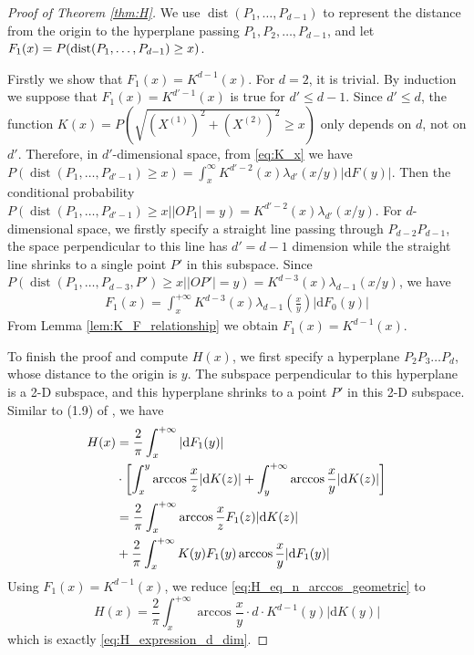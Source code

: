 \documentclass[conference,a4paper]{IEEEtran}
\DeclareMathOperator{\dist}{dist}
\def\d{\mathrm{d}}
\begin{document}
\begin{proof}[Proof of Theorem \ref{thm:H}]
     
We use $\dist(P_1,\dots, P_{d-1})$ to represent
the distance from the origin to the hyperplane passing $P_1,P_2,\dots, P_{d-1}$,
and let $F_1(x)=P(\dist(P_1,\dots, P_{d-1})\linebreak\geq x)$.


Firstly we show that $F_1(x)=K^{d-1}(x)$.
For $d=2$, it is trivial.
By induction we suppose that $F_1(x)=K^{d'-1}(x)$ is true for
$d'\leq d-1$.
Since $d'\leq d$,
the function $K(x)=P(\sqrt{(X^{(1)})^2 + (X^{(2)})^2} \geq x)$
only depends on $d$,
not on $d'$.
Therefore, in $d'$-dimensional space,
from \eqref{eq:K_x} we have $
P(\dist(P_1, \dots, P_{d'-1})\geq x) = \int_{x}^{\infty} K^{d'-2}(x)\lambda_{d'}(x/y)|\d F(y)|
$.
Then the conditional probability $P(\dist(P_1,\dots, P_{d'-1})\geq x \Big\vert |OP_1|=y)
=K^{d'-2}(x)\lambda_{d'}(x/y)$.
For $d$-dimensional space, 
we firstly specify a straight line passing through $P_{d-2}P_{d-1}$,
the space perpendicular 
to this line has $d'=d-1$ dimension while the straight line shrinks to a single point $P'$
in this subspace. Since
$P(\dist(P_1,\dots,P_{d-3},P')\geq x \Big\vert |OP'|=y)=
K^{d-3}(x)\lambda_{d-1}(x/y)$,
we have
\begin{align*}
    F_1(x) = \int_x^{+\infty} K^{d-3}(x) \lambda_{d-1}(\frac{x}{y})|\d F_0(y)|
\end{align*}
From Lemma \ref{lem:K_F_relationship} we obtain $F_1(x) = K^{d-1}(x)$.

To finish the proof and compute $H(x)$, we first specify a hyperplane $P_2P_3\dots P_{d}$,
whose distance to the origin is $y$. The subspace perpendicular to this hyperplane is a 2-D subspace,
and this hyperplane shrinks to a point $P'$ in this 2-D subspace.
Similar to (1.9) of \cite{carnal1970konvexe}, we have
\begin{align}
     H(x) &= \frac{2}{\pi}\int_x^{+\infty}|\d F_1(y)|\notag\\
     &\cdot\left[ \int_x^y \arccos\frac{x}{z}|\d K(z)|
     +\int_y^{+\infty}\arccos\frac{x}{y} |\d K(z)|\right]\notag\\
     &=\frac{2}{\pi}\int_x^{+\infty} \arccos\frac{x}{z}
     F_1(z)|\d K(z)|\notag \\
     &+\frac{2}{\pi}\int_{x}^{+\infty} K(y)F_1(y)\arccos\frac{x}{y}|\d F_1(y)| \label{eq:H_eq_n_arccos_geometric}
 \end{align}
Using $F_1(x)=K^{d-1}(x)$,
we reduce \eqref{eq:H_eq_n_arccos_geometric} to
 $$
 H(x) = \frac{2}{\pi}\int_x^{+\infty}  \arccos\frac{x}{y}\cdot
 d\cdot  K^{d-1}(y) |\d K(y)|
 $$
 which is exactly \eqref{eq:H_expression_d_dim}.
 
\end{proof}
\end{document}
